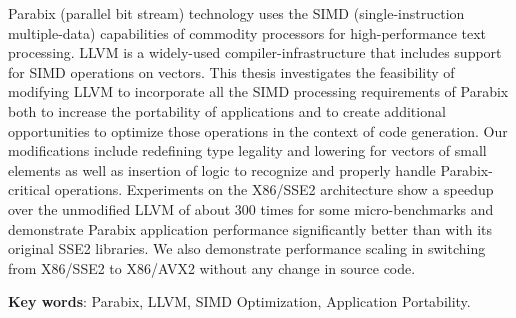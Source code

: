
%
%


Parabix (parallel bit stream) technology uses the SIMD (single-instruction multiple-data) capabilities of commodity processors for high-performance text processing. LLVM is a widely-used compiler-infrastructure that includes support for SIMD operations on vectors. This thesis investigates the feasibility of modifying LLVM to incorporate all the SIMD processing requirements of Parabix both to increase the portability of applications and to create additional opportunities to optimize those operations in the context of code generation. Our modifications include redefining type legality and lowering for vectors of small elements as well as insertion of logic to recognize and properly handle Parabix-critical operations. Experiments on the X86/SSE2 architecture show a speedup over the unmodified LLVM of about 300 times for some micro-benchmarks and demonstrate Parabix application performance significantly better than with its original SSE2 libraries. We also demonstrate performance scaling in switching from X86/SSE2 to X86/AVX2 without any change in source code.

\textbf{Key words}: Parabix, LLVM, SIMD Optimization, Application Portability.
